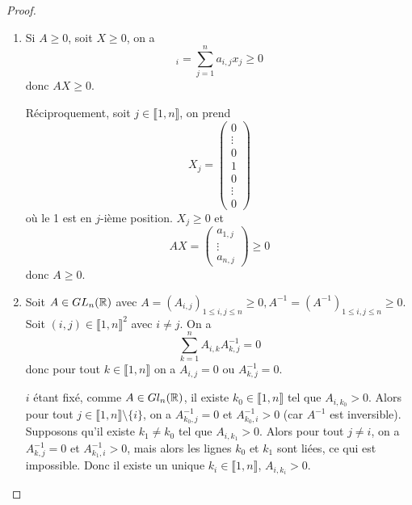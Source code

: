 \begin{proof}
    \phantom{}
    \begin{enumerate}
        \item Si $A\geqslant0$, soit $X\geqslant0$, on a 
        \begin{equation}
            [AX]_{i}=\sum_{j=1}^{n}a_{i,j}x_{j}\geqslant 0
        \end{equation}
        donc $AX\geqslant0$.

        Réciproquement, soit $j\in\llbracket1,n\rrbracket$, on prend 
        \begin{equation}
            X_{j}=
            \begin{pmatrix}
                0\\
                \vdots\\
                0\\
                1\\
                0\\
                \vdots\\
                0    
            \end{pmatrix}
        \end{equation}
        où le 1 est en $j$-ième position. $X_{j}\geqslant0$ et 
        \begin{equation}
            AX=
            \begin{pmatrix}
                a_{1,j}\\
                \vdots\\
                a_{n,j}
            \end{pmatrix}
            \geqslant0
        \end{equation}
        donc $A\geqslant0$.

        \item Soit $A\in GL_{n}(\mathbb{R})$ avec $A=(A_{i,j})_{1\leqslant i,j\leqslant n}\geqslant0,A^{-1}=(A^{-1})_{1\leqslant i,j\leqslant n}\geqslant0$. Soit $(i,j)\in\llbracket1,n\rrbracket^{2}$ avec $i\neq j$. On a 
        \begin{equation}
            \sum_{k=1}^{n}A_{i,k}A^{-1}_{k,j}=0
        \end{equation}
        donc pour tout $k\in\llbracket1,n\rrbracket$ on a $A_{i,j}=0$ ou $A^{-1}_{k,j}=0$.

        $i$ étant fixé, comme $A\in Gl_{n}(\mathbb{R})$, il existe $k_{0}\in\llbracket1,n\rrbracket$ tel que $A_{i,k_{0}}>0$. Alors pour tout $j\in\llbracket1,n\rrbracket\setminus\lbrace i\rbrace$, on a $A^{-1}_{k_{0},j}=0$ et $A^{-1}_{k_{0},i}>0$ (car $A^{-1}$ est inversible). Supposons qu'il existe $k_{1}\neq k_{0}$ tel que $A_{i,k_{1}}>0$. Alors pour tout $j\neq i$, on a $A^{-1}_{k,j}=0$ et $A^{-1}_{k_{1},i}>0$, mais alors les lignes $k_{0}$ et $k_{1}$ sont liées, ce qui est impossible. Donc il existe un unique $k_{i}\in\llbracket1,n\rrbracket$, $A_{i,k_{i}}>0$.


\end{enumerate}
\end{proof}
